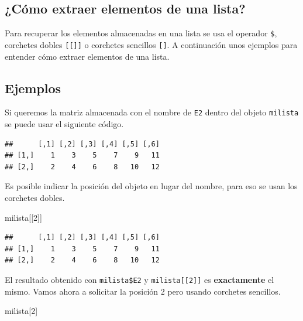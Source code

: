 \documentclass[10pt,]{krantz}
\makeatletter
\newenvironment{Shaded}{\begin{snugshade}}{\end{snugshade}}
\newcommand{\DecValTok}[1]{\textcolor[rgb]{0.00,0.00,0.81}{{#1}}}
\newcommand{\NormalTok}[1]{{#1}}
\newenvironment{kframe}{%
\medskip{}
\setlength{\fboxsep}{.8em}
 \def\at@end@of@kframe{}%
 \ifinner\ifhmode%
  \def\at@end@of@kframe{\end{minipage}}%
  \begin{minipage}{\columnwidth}%
 \fi\fi%
 \def\FrameCommand##1{\hskip\@totalleftmargin \hskip-\fboxsep
 \colorbox{shadecolor}{##1}\hskip-\fboxsep
     \hskip-\linewidth \hskip-\@totalleftmargin \hskip\columnwidth}%
 \MakeFramed {\advance\hsize-\width
   \@totalleftmargin\z@ \linewidth\hsize
   \@setminipage}}%
 {\par\unskip\endMakeFramed%
 \at@end@of@kframe}
\renewenvironment{Shaded}{\begin{kframe}}{\end{kframe}}
\makeatother
\begin{document}
\subsection{¿Cómo extraer elementos de una
lista?}\label{como-extraer-elementos-de-una-lista}

Para recuperar los elementos almacenadas en una lista se usa el operador
\texttt{\$}, corchetes dobles \texttt{{[}{[}{]}{]}} o corchetes
sencillos \texttt{{[}{]}}. A continuación unos ejemplos para entender
cómo extraer elementos de una lista.

\subsection*{Ejemplos}\label{ejemplos-1}


Si queremos la matriz almacenada con el nombre de \texttt{E2} dentro del
objeto \texttt{milista} se puede usar el siguiente código.

\begin{Shaded}
\end{Shaded}

\begin{verbatim}
##      [,1] [,2] [,3] [,4] [,5] [,6]
## [1,]    1    3    5    7    9   11
## [2,]    2    4    6    8   10   12
\end{verbatim}

Es posible indicar la posición del objeto en lugar del nombre, para eso
se usan los corchetes dobles.

\begin{Shaded}
\begin{Highlighting}[]
\NormalTok{milista[[}\DecValTok{2}\NormalTok{]]}
\end{Highlighting}
\end{Shaded}

\begin{verbatim}
##      [,1] [,2] [,3] [,4] [,5] [,6]
## [1,]    1    3    5    7    9   11
## [2,]    2    4    6    8   10   12
\end{verbatim}

El resultado obtenido con \texttt{milista\$E2} y
\texttt{milista{[}{[}2{]}{]}} es \textbf{exactamente} el mismo. Vamos
ahora a solicitar la posición 2 pero usando corchetes sencillos.

\begin{Shaded}
\begin{Highlighting}[]
\NormalTok{milista[}\DecValTok{2}\NormalTok{]}
\end{Highlighting}
\end{Shaded}
\end{document}
